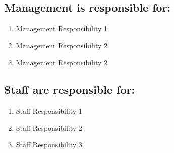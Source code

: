 \documentclass[12pt]{article}
\begin{document}
\subsection{Management is responsible for:}
\begin{enumerate}
\item{Management Responsibility 1}
\item{Management Responsibility 2}
\item{Management Responsibility 2}
\end{enumerate}
\subsection{Staff are responsible for:}
\begin{enumerate}
\item{Staff Responsibility 1}
\item{Staff Responsibility 2}
\item{Staff Responsibility 3}
\end{enumerate}
\end{document}
